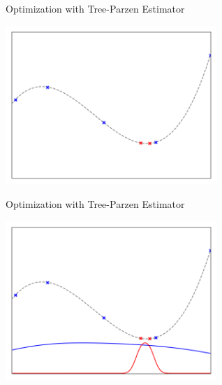 \begin{frame}[c]{Optimization with Tree-Parzen Estimator}

\centering
\includegraphics[width=0.6\textwidth]{images/tpe/tpeiter_3_observations.png}


\end{frame}
\begin{frame}[c]{Optimization with Tree-Parzen Estimator}

\centering
\includegraphics[width=0.6\textwidth]{images/tpe/tpeiter_3_pdfs.png}


\end{frame}

